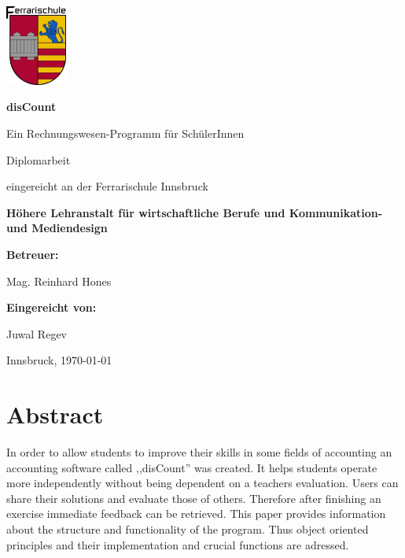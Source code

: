 \documentclass[12pt]{report}
\begin{document}
  
   
  
\begin{titlepage}
	\centering
	\includegraphics[width=0.15\textwidth]{images/ferrarilogo.jpg}\par\vspace{1cm}
	\vspace{3cm}
	{\huge \textbf{disCount}\par}
	\vspace{0.5cm}
	{\huge Ein Rechnungswesen-Programm für SchülerInnen}\par
			
	\vspace{1.5cm}
			
	{\huge Diplomarbeit\par}
			
	\vspace{1.5cm}
			
	{\large eingereicht an der Ferrarischule Innsbruck}\par
	\vspace{0.5cm}
	{\large \textbf{Höhere Lehranstalt für wirtschaftliche Berufe und Kommunikation- und Mediendesign}}\par
	\vspace{1cm}
	{\large \textbf{Betreuer:}}\par
	\vspace{0.5cm}
	{\large Mag. Reinhard Hones}\par
	\vspace{1cm}
	{\large \textbf{Eingereicht von:}}\par
	\vspace{0.5cm}
	{\large Juwal Regev}\par
		
	\vfill
	{\large Innsbruck,  \today\par}
\end{titlepage}
  


\newpage
  
  
\section*{Abstract}

In order to allow students to improve their skills in some fields of accounting an accounting software called ,,disCount'' was created. It helps students operate more independently without being dependent on a teachers evaluation. Users can share their solutions and evaluate those of others.
Therefore after finishing an exercise immediate feedback can be retrieved. This paper provides information about the structure and functionality of the program. Thus object oriented principles and their implementation and crucial functions are adressed.\\\\
\end{document}
